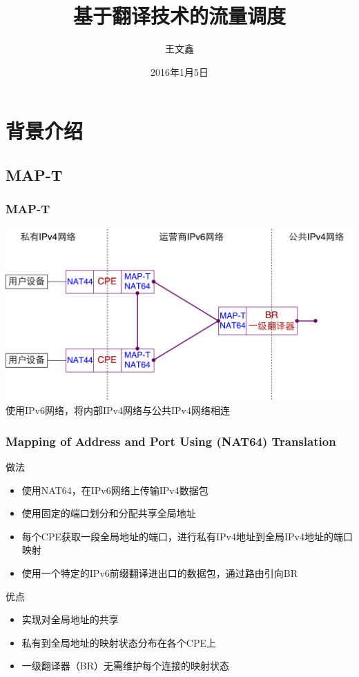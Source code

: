 \documentclass{beamer}
\title{基于翻译技术的流量调度}
\author{王文鑫}
\date{2016年1月5日}
\begin{document}
\begin{frame}
  \titlepage
\end{frame}

\section{背景介绍}
\subsection{MAP-T}

\begin{frame}
  \frametitle{MAP-T}

  \includegraphics[width=\textwidth]{figs/MAP-T.pdf}  
  \vspace{1.5em}
  使用IPv6网络，将内部IPv4网络与公共IPv4网络相连
\end{frame}

\begin{frame}
  \frametitle{Mapping of Address and Port Using (NAT64) Translation}

  \begin{block}{做法}
    \begin{itemize}
    \item 使用NAT64，在IPv6网络上传输IPv4数据包
    \item 使用固定的端口划分和分配共享全局地址
    \item 每个CPE获取一段全局地址的端口，进行私有IPv4地址到全局IPv4地址的端口映射
    \item 使用一个特定的IPv6前缀翻译进出口的数据包，通过路由引向BR
    \end{itemize}
  \end{block}

  \begin{block}{优点}
    \begin{itemize}
    \item 实现对全局地址的共享
    \item 私有到全局地址的映射状态分布在各个CPE上
    \item 一级翻译器（BR）无需维护每个连接的映射状态
    \end{itemize}
  \end{block}

\end{frame}
\end{document}
